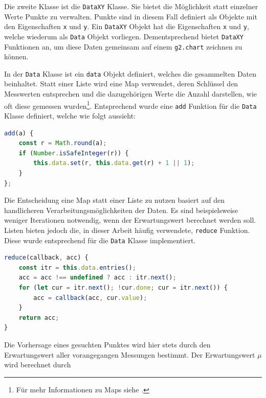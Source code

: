 Die zweite Klasse ist die \lstinline{DataXY} Klasse.
Sie bietet die Möglichkeit statt einzelner Werte Punkte zu verwalten.
Punkte sind in diesem Fall definiert als Objekte mit den Eigenschaften \lstinline{x} und \lstinline{y}.
Ein \lstinline{DataXY} Objekt hat die Eigenschaften \lstinline{x} und \lstinline{y}, welche wiederum als \lstinline{Data} Objekt vorliegen.
Dementsprechend bietet \lstinline{DataXY} Funktionen an, um diese Daten gemeinsam auf einem \lstinline{g2.chart} zeichnen zu können.

In der \lstinline{Data} Klasse ist ein \lstinline{data} Objekt definiert, welches die gesammelten Daten beinhaltet.
Statt einer Liste wird eine Map verwendet, deren Schlüssel den Messwerten entsprechen und die dazugehörigen Werte die Anzahl darstellen, wie oft diese gemessen wurden\footnote{Für mehr Informationen zu Maps siehe .}.
Entsprechend wurde eine \lstinline{add} Funktion für die \lstinline{Data} Klasse definiert, welche wie folgt aussieht:

\begin{lstlisting}[language=JavaScript, caption={Definition der \lstinline{add} Funktion, welche dazu genutzt wird der \lstinline{Data} Klasse neue Werte hinzuzufügen.}, label={lst:data_add}]
add(a) {
    const r = Math.round(a);
    if (Number.isSafeInteger(r)) {
        this.data.set(r, this.data.get(r) + 1 || 1);
    }
};
\end{lstlisting}

Die Entscheidung eine Map statt einer Liste zu nutzen basiert auf den handlicheren Verarbeitungsmöglichkeiten der Daten.
Es sind beispielsweise weniger Iterationen notwendig, wenn der Erwartungswert berechnet werden soll.
Listen bieten jedoch die, in dieser Arbeit häufig verwendete, \lstinline{reduce} Funktion.
Diese wurde entsprechend für die \lstinline{Data} Klasse implementiert.

\begin{lstlisting}[language=JavaScript, caption={Definition der \lstinline{reduce} Funktion, um die Standardfunktion der Liste nachzubilden.}, label={lst:data_reduce}]
reduce(callback, acc) {
    const itr = this.data.entries();
    acc = acc !== undefined ? acc : itr.next();
    for (let cur = itr.next(); !cur.done; cur = itr.next()) {
        acc = callback(acc, cur.value);
    }
    return acc;
}
\end{lstlisting}

Die Vorhersage eines gesuchten Punktes wird hier stets durch den Erwartungswert aller vorangegangen Messungen bestimmt.
Der Erwartungswert $\mu$ wird berechnet durch~\cite[S.~143]{KlausEden2014}

